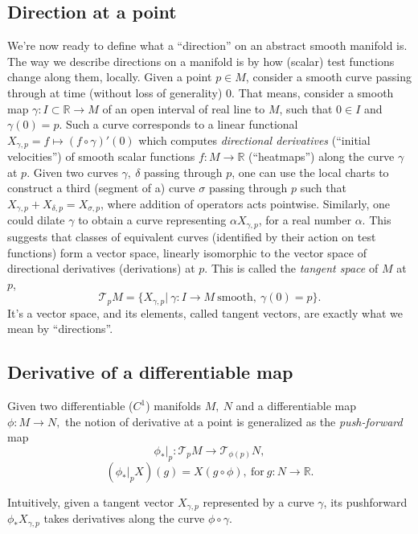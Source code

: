 \subsection*{Direction at a point}

We're now ready to define what a ``direction'' on an abstract smooth manifold
is. The way we describe directions on a manifold is by how (scalar) test
functions change along them, locally.
Given a point \( p\in M \), consider a smooth curve passing through at
time (without loss of generality) \( 0 \). That means, consider a smooth map \(
\gamma:I\subset\mathbb{R} \to M \) of an open interval of real line to \( M \),
such that \( 0\in I \) and \( \gamma(0) = p \). Such a curve corresponds to a
linear functional \( X_{\gamma, p} = f\mapsto (f\circ \gamma)'(0) \) which
computes \emph{directional derivatives} (``initial velocities'') of smooth
scalar functions \( f:M\to\mathbb{R} \) (``heatmaps'') along the curve \(
\gamma \) at \( p \).
Given two curves \( \gamma,~\delta \) passing through \( p \), one can use the
local charts to construct a third (segment of a) curve \( \sigma \) passing
through \( p \) such that \( X_{\gamma, p} + X_{\delta, p} = X_{\sigma, p} \),
where addition of operators acts pointwise.  Similarly, one could dilate \(
\gamma \) to obtain a curve representing \( \alpha X_{\gamma, p} \), for a real
number \( \alpha \). This suggests that classes of equivalent curves
(identified by their action on test functions) form a vector space, linearly isomorphic
to the vector space of directional derivatives (derivations) at \( p \).
This is called the \emph{tangent space} of \( M \) at \( p \),
\[ \mathcal{T}_pM = \{ X_{\gamma, p}\left|~\gamma:I\to M~\text{smooth},~\gamma(0)=p\right.\}. \]
It's a vector space, and its elements, called tangent vectors, are exactly what
we mean by ``directions''.

\subsection*{Derivative of a differentiable map}

Given two differentiable (\( C^1 \)) manifolds \( M,~N \)
and a differentiable map \( \phi: M\to N, \) the notion of
derivative at a point is generalized as the \emph{push-forward} map
\[ \left.\phi_*\right|_p : \mathcal{T}_p M \to \mathcal{T}_{\phi(p)}N, \]
\[ (\left.\phi_*\right|_p X)(g) = X(g\circ \phi),~\text{for}~g:N\to\mathbb{R}. \]

Intuitively, given a tangent vector \( X_{\gamma, p} \) represented by a curve
\( \gamma \), its pushforward \( \phi_* X_{\gamma, p} \) takes derivatives
along the curve \( \phi \circ \gamma \).

